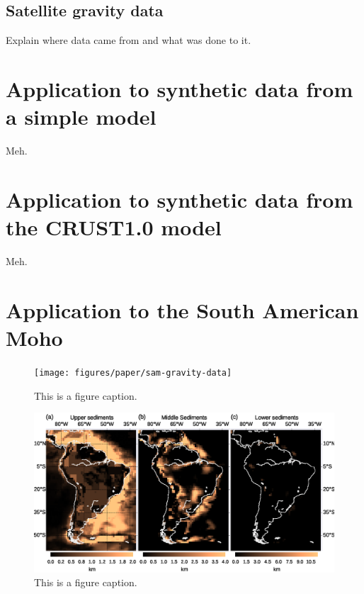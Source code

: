 \documentclass[extra,mreferee]{gji}
\begin{document}

\subsection{Satellite gravity data}


Explain where data came from and what was done to  it.


\section{Application to synthetic data from a simple model}


Meh.


\section{Application to synthetic data from the CRUST1.0 model}

Meh.


\section{Application to the South American Moho}

\begin{figure}
    \centering
    \texttt{[image: figures/paper/sam-gravity-data]}
    \caption{This is a figure caption.}
    \label{fig:sam-data}
\end{figure}

\begin{figure}
    \centering
    \includegraphics[width=\textwidth]{figures/paper/sam-gravity-sed}
    \caption{This is a figure caption.}
    \label{fig:sam-sed}
\end{figure}
\end{document}
